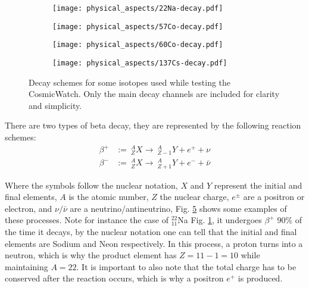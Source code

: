 \begin{figure}[H]
    \centering
    \begin{subfigure}[t]{0.45\textwidth}
      \texttt{[image: physical\_aspects/22Na-decay.pdf]}
      \caption{\label{sfig:22Na}}
    \end{subfigure}
    \begin{subfigure}[t]{0.45\textwidth}
      \texttt{[image: physical\_aspects/57Co-decay.pdf]}
      \caption{\label{sfig:57Co}}
    \end{subfigure}
    \medskip
    \centering
    \begin{subfigure}[t]{0.45\textwidth}
      \texttt{[image: physical\_aspects/60Co-decay.pdf]}
      \caption{\label{sfig:60Co}}
    \end{subfigure}
    \begin{subfigure}[t]{0.45\textwidth}
      \texttt{[image: physical\_aspects/137Cs-decay.pdf]}
      \caption{\label{sfig:137Cs}}
    \end{subfigure}
    \caption{\label{fig:decay_schemes}Decay schemes for some isotopes used while testing the CosmicWatch. Only the main decay channels are included for clarity and simplicity.}
\end{figure}

There are two types of beta decay, they are represented by the following reaction schemes:
\begin{align}
    \beta^+ &:=~ ^A_ZX \rightarrow ~ ^A_{Z-1}Y + e^+ + \nu \\
    \beta^- &:=~ ^A_ZX \rightarrow ~ ^A_{Z+1}Y + e^- + \bar{\nu}
\end{align}

Where the symbols follow the nuclear notation, $X$ and $Y$ represent the initial and final elements, $A$ is the atomic number, $Z$ the nuclear charge, $e^{\pm}$ are a positron or electron, and $\nu/\bar{\nu}$ are a neutrino/antineutrino, Fig. \ref{fig:decay_schemes} shows some examples of these processes. Note for instance the case of $^{22}_{11}$Na Fig. \ref{sfig:22Na}, it undergoes $\beta^+$ $90\%$ of the time it decays, by the nuclear notation one can tell that the initial and final elements are Sodium and Neon respectively. In this process, a proton turns into a neutron, which is why the product element has $Z=11-1=10$ while maintaining $A=22$. It is important to also note that the total charge has to be conserved after the reaction occurs, which is why a positron $e^+$ is produced.

